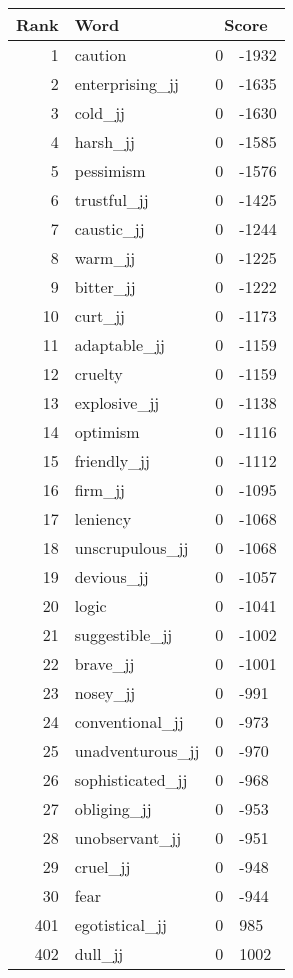 \begin{longtable}[!htbp]{| rlr@{.}l |}
    \hline
    \textbf{Rank} & \textbf{Word} & \multicolumn{2}{c|}{\textbf{Score}} \\
    \hline
    \endhead
    1 & caution & 0 & -1932 \\
    2 & enterprising\_jj & 0 & -1635 \\
    3 & cold\_jj & 0 & -1630 \\
    4 & harsh\_jj & 0 & -1585 \\
    5 & pessimism & 0 & -1576 \\
    6 & trustful\_jj & 0 & -1425 \\
    7 & caustic\_jj & 0 & -1244 \\
    8 & warm\_jj & 0 & -1225 \\
    9 & bitter\_jj & 0 & -1222 \\
    10 & curt\_jj & 0 & -1173 \\
    11 & adaptable\_jj & 0 & -1159 \\
    12 & cruelty & 0 & -1159 \\
    13 & explosive\_jj & 0 & -1138 \\
    14 & optimism & 0 & -1116 \\
    15 & friendly\_jj & 0 & -1112 \\
    16 & firm\_jj & 0 & -1095 \\
    17 & leniency & 0 & -1068 \\
    18 & unscrupulous\_jj & 0 & -1068 \\
    19 & devious\_jj & 0 & -1057 \\
    20 & logic & 0 & -1041 \\
    21 & suggestible\_jj & 0 & -1002 \\
    22 & brave\_jj & 0 & -1001 \\
    23 & nosey\_jj & 0 & -991 \\
    24 & conventional\_jj & 0 & -973 \\
    25 & unadventurous\_jj & 0 & -970 \\
    26 & sophisticated\_jj & 0 & -968 \\
    27 & obliging\_jj & 0 & -953 \\
    28 & unobservant\_jj & 0 & -951 \\
    29 & cruel\_jj & 0 & -948 \\
    30 & fear & 0 & -944 \\
    401 & egotistical\_jj & 0 & 985 \\
    402 & dull\_jj & 0 & 1002 \\

\end{longtable}

